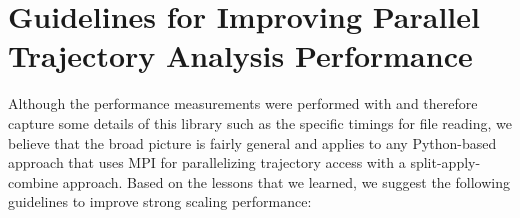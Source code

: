 
\section{Guidelines for Improving Parallel Trajectory Analysis Performance}
\label{sec:guidelines}

Although the performance measurements were performed with  and therefore capture some details of this library such as the specific timings for file reading, we believe that the broad picture is fairly general and applies to any Python-based approach that uses MPI for parallelizing trajectory access with a split-apply-combine approach.
Based on the lessons that we learned, we suggest the following guidelines to improve strong scaling performance:
